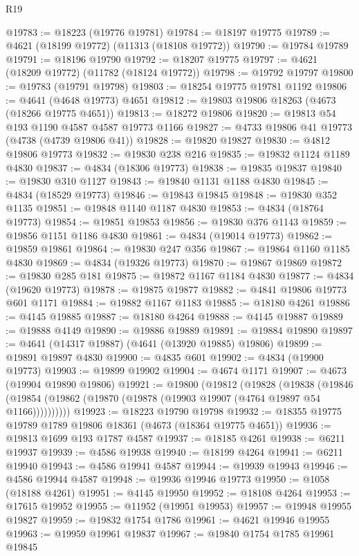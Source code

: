 \begin{lexlean}{R19}
\begin{coremodule}
@19783 := @18223 (@19776 @19781)
@19784 := @18197 @19775
@19789 := @4621 (@18199 @19772) (@11313 (@18108 @19772))
@19790 := @19784 @19789
@19791 := @18196 @19790
@19792 := @18207 @19775
@19797 := @4621 (@18209 @19772) (@11782 (@18124 @19772))
@19798 := @19792 @19797
@19800 := @19783 (@19791 @19798)
@19803 := @18254 @19775 @19781 @1192
@19806 := @4641 (@4648 @19773) @4651
@19812 := @19803 @19806 @18263 (@4673 (@18266 @19775 @4651))
@19813 := @18272 @19806
@19820 := @19813 @54 @193 @1190 @4587 @4587 @19773 @1166
@19827 := @4733 @19806 @41 @19773 (@4738 (@4739 @19806 @41))
@19828 := @19820 @19827
@19830 := @4812 @19806 @19773
@19832 := @19830 @238 @216
@19835 := @19832 @1124 @1189 @4830
@19837 := @4834 (@18306 @19773)
@19838 := @19835 @19837
@19840 := @19830 @310 @1127
@19843 := @19840 @1131 @1188 @4830
@19845 := @4834 (@18529 @19773)
@19846 := @19843 @19845
@19848 := @19830 @352 @1135
@19851 := @19848 @1140 @1187 @4830
@19853 := @4834 (@18764 @19773)
@19854 := @19851 @19853
@19856 := @19830 @376 @1143
@19859 := @19856 @1151 @1186 @4830
@19861 := @4834 (@19014 @19773)
@19862 := @19859 @19861
@19864 := @19830 @247 @356
@19867 := @19864 @1160 @1185 @4830
@19869 := @4834 (@19326 @19773)
@19870 := @19867 @19869
@19872 := @19830 @285 @181
@19875 := @19872 @1167 @1184 @4830
@19877 := @4834 (@19620 @19773)
@19878 := @19875 @19877
@19882 := @4841 @19806 @19773 @601 @1171
@19884 := @19882 @1167 @1183
@19885 := @18180 @4261
@19886 := @4145 @19885
@19887 := @18180 @4264
@19888 := @4145 @19887
@19889 := @19888 @4149
@19890 := @19886 @19889
@19891 := @19884 @19890
@19897 := @4641 (@14317 @19887) (@4641 (@13920 @19885) @19806)
@19899 := @19891 @19897 @4830
@19900 := @4835 @601
@19902 := @4834 (@19900 @19773)
@19903 := @19899 @19902
@19904 := @4674 @1171
@19907 := @4673 (@19904 @19890 @19806)
@19921 := @19800
    (@19812
      (@19828
        (@19838
          (@19846 (@19854 (@19862 (@19870 (@19878 (@19903 @19907 (@4764 @19897 @54 @1166))))))))))
@19923 := @18223 @19790 @19798
@19932 := @18355 @19775 @19789 @1789 @19806 @18361 (@4673 (@18364 @19775 @4651))
@19936 := @19813 @1699 @193 @1787 @4587
@19937 := @18185 @4261
@19938 := @6211 @19937
@19939 := @4586 @19938
@19940 := @18199 @4264
@19941 := @6211 @19940
@19943 := @4586 @19941 @4587
@19944 := @19939 @19943
@19946 := @4586 @19944 @4587
@19948 := @19936 @19946 @19773
@19950 := @1058 (@18188 @4261)
@19951 := @4145 @19950
@19952 := @18108 @4264
@19953 := @17615 @19952
@19955 := @11952 (@19951 @19953)
@19957 := @19948 @19955 @19827
@19959 := @19832 @1754 @1786
@19961 := @4621 @19946 @19955
@19963 := @19959 @19961 @19837
@19967 := @19840 @1754 @1785 @19961 @19845

\end{coremodule}
\end{lexlean}
